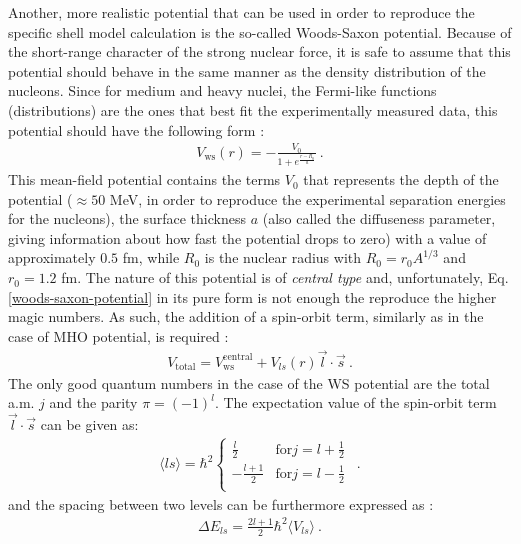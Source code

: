 Another, more realistic potential that can be used in order to reproduce the specific shell model calculation is the so-called Woods-Saxon potential. Because of the short-range character of the strong nuclear force, it is safe to assume that this potential should behave in the same manner as the density distribution of the nucleons. Since for medium and heavy nuclei, the Fermi-like functions (distributions) are the ones that best fit the experimentally measured data, this potential should have the following form \cite{woods1954diffuse}:
\begin{align}
    V_\text{ws}(r)=-\frac{V_0}{1+e^{\frac{r-R_0}{a}}}\ .
    \label{woods-saxon-potential}
\end{align}
This mean-field potential contains the terms $V_0$ that represents the depth of the potential ($\approx 50$ MeV, in order to reproduce the experimental separation energies for the nucleons), the surface thickness $a$ (also called the diffuseness parameter, giving information about how fast the potential drops to zero) with a value of approximately $0.5$ fm, while $R_0$ is the nuclear radius with $R_0=r_0A^{1/3}$ and $r_0=1.2$ fm. The nature of this potential is of \emph{central type} and, unfortunately, Eq. \ref{woods-saxon-potential} in its pure form is not enough the reproduce the higher magic numbers. As such, the addition of a spin-orbit term, similarly as in the case of MHO potential, is required \cite{martin2017particle}: 
\begin{align}
    V_\text{total}=V_\text{ws}^\text{central}+V_{ls}(r)\vec{l}\cdot\vec{s}\ .
    \label{woods-saxon-so-potential}
\end{align}
The only good quantum numbers in the case of the WS potential are the total a.m. $j$ and the parity $\pi=(-1)^l$.
The expectation value of the spin-orbit term $\vec{l}\cdot\vec{s}$ can be given as:
\begin{align}
    \langle ls \rangle=\hbar^2\begin{cases}
        \frac{l}{2} \quad &\text{for} j=l+\frac{1}{2}\\
        -\frac{l+1}{2} &\text{for} j=l-\frac{1}{2}\ \\
   \end{cases}\ .
\end{align}
and the spacing between two levels can be furthermore expressed as \cite{martin2017particle}:
\begin{align}
    \Delta E_{ls}=\frac{2l+1}{2}\hbar^2\langle V_{ls}\rangle\ .
\end{align}
